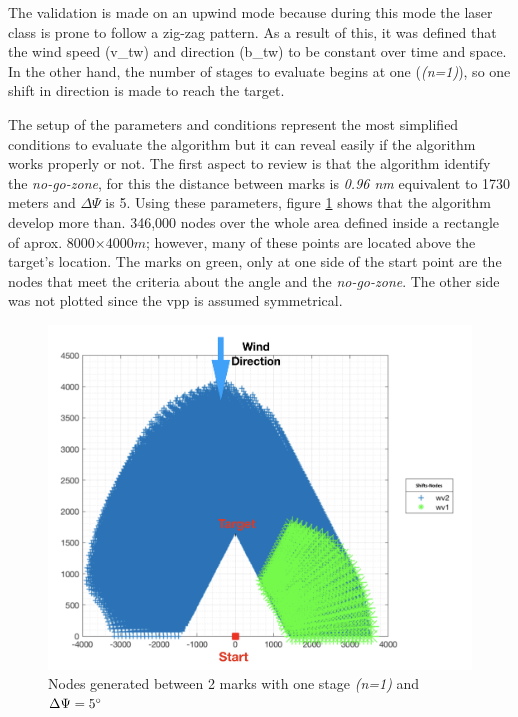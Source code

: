 The validation is made on an upwind mode because during this mode the laser class is prone to follow a zig-zag pattern. As a result of this, it was defined that the wind speed (\acrshort{v_tw}) and direction (\acrshort{b_tw}) to be constant over time and space. In the other hand, the number of stages to evaluate begins at one (\textit{(n=1)}), so one shift in direction is made to reach the target.%
\par 
The setup of the parameters and conditions represent the most simplified conditions to evaluate the algorithm but it can reveal easily if the algorithm works properly or not. The first aspect to review is that the algorithm identify the \textit{no-go-zone}, for this the distance between marks is \textit{0.96 nm} equivalent to 1730 meters and $\Delta \Psi$ is 5\degree. Using these parameters, figure \ref{fig:Onestages_NoGoZone} shows that the algorithm develop more than. 346,000 nodes over the whole area defined inside a rectangle of aprox. 8000$\times 4000 m$; however, many of these points are located above the target's location. The marks on green, only at one side of the start point are the nodes that meet the criteria about the angle and the \textit{no-go-zone}. The other side was not plotted %
since the \acrshort{vpp} is assumed symmetrical.\par 

\begin{figure} [hbt!]
    \centering
    \includegraphics[width=0.45 \linewidth]{images/Nodes_2wv_5deg_5s.png}
    \caption{Nodes generated between 2 marks with one stage \textit{(n=1)} and  $\Delta \Psi = 5 \degree$}
    \label{fig:Onestages_NoGoZone}
\end{figure}

